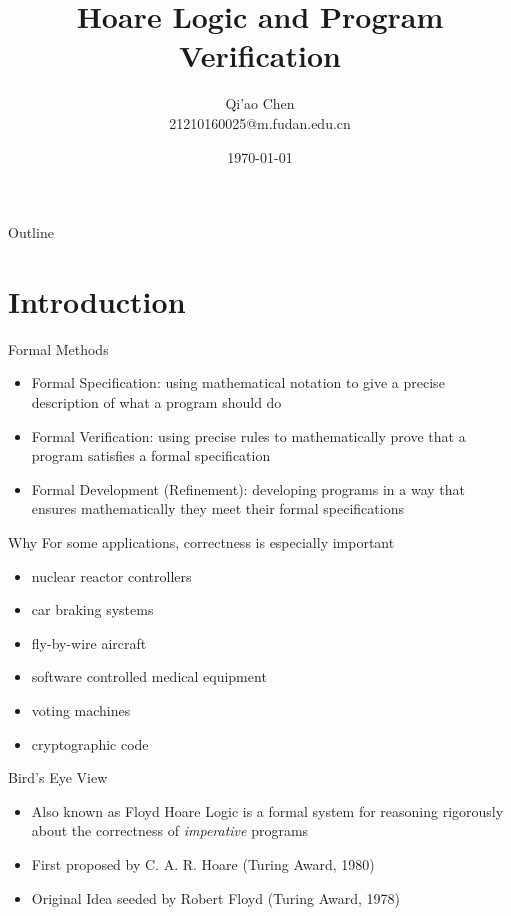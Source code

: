 \documentclass[presentation]{beamer}
\author{Qi'ao Chen\\21210160025@m.fudan.edu.cn}
\date{\today}
\title{Hoare Logic and Program Verification}
\begin{document}
\maketitle
\begin{frame}{Outline}
\tableofcontents
\end{frame}

\section{Introduction}
\label{sec:org08617e2}
\begin{frame}[label={sec:org3c0ef75}]{Formal Methods}
\begin{itemize}
\item \alert{Formal Specification}: using mathematical notation to give a precise description of what a
program should do
\item \alert{Formal Verification}: using precise rules to mathematically prove that a program satisfies a
formal specification
\item \alert{Formal Development (Refinement)}: developing programs in a way that ensures mathematically they
meet their formal specifications
\end{itemize}
\end{frame}
\begin{frame}[label={sec:orgbb70686}]{Why}
For some applications, correctness is especially important
\begin{itemize}
\item nuclear reactor controllers
\item car braking systems
\item fly-by-wire aircraft
\item software controlled medical equipment
\item voting machines
\item cryptographic code
\end{itemize}
\end{frame}
\begin{frame}[label={sec:org18f8130}]{Bird's Eye View}
\begin{itemize}
\item Also known as \alert{Floyd Hoare Logic} is a formal system for reasoning rigorously about the
correctness of \emph{imperative} programs
\item First proposed by C. A. R. Hoare (Turing Award, 1980)
\item Original Idea seeded by Robert Floyd (Turing Award, 1978)
\end{itemize}
\end{frame}
\end{document}
